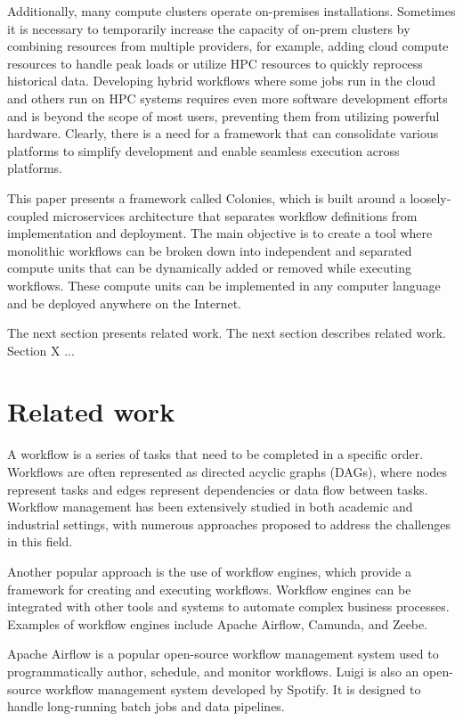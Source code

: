 \documentclass{article}
\begin{document}
Additionally, many compute clusters operate on-premises installations. Sometimes it is necessary to temporarily increase the capacity of on-prem clusters by combining resources from multiple providers, for example, adding cloud compute resources to handle peak loads or utilize HPC resources to quickly reprocess historical data. Developing hybrid workflows where some jobs run in the cloud and others run on HPC systems requires even more software development efforts and is beyond the scope of most users, preventing them from utilizing powerful hardware. Clearly, there is a need for a framework that can consolidate various platforms to simplify development and enable seamless execution across platforms.

This paper presents a framework called Colonies, which is built around a loosely-coupled microservices architecture that separates workflow definitions from implementation and deployment. The main objective is to create a tool where monolithic workflows can be broken down into independent and separated compute units that can be dynamically added or removed while executing workflows. These compute units can be implemented in any computer language and be deployed anywhere on the Internet. 

The next section presents related work. The next section describes related work. Section X ...

\section{Related work}
A workflow is a series of tasks that need to be completed in a specific order. Workflows are often represented as directed acyclic graphs (DAGs), where nodes represent tasks and edges represent dependencies or data flow between tasks. Workflow management has been extensively studied in both academic and industrial settings, with numerous approaches proposed to address the challenges in this field.

Another popular approach is the use of workflow engines, which provide a framework for creating and executing workflows. Workflow engines can be integrated with other tools and systems to automate complex business processes. Examples of workflow engines include Apache Airflow, Camunda, and Zeebe.


Apache Airflow is a popular open-source workflow management system used to programmatically author, schedule, and monitor workflows.
Luigi is also an open-source workflow management system developed by Spotify. It is designed to handle long-running batch jobs and data pipelines.
\end{document}
